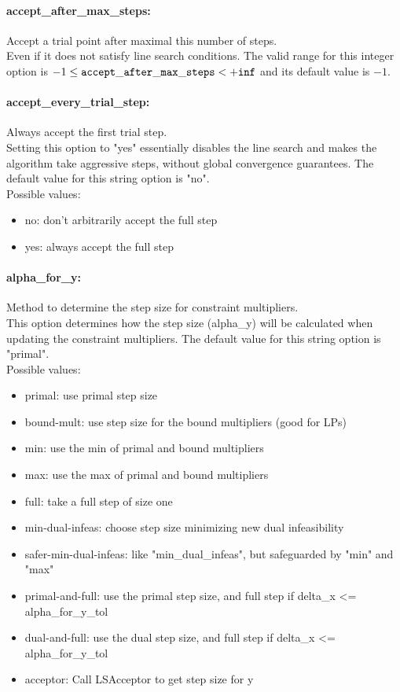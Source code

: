 \paragraph{accept\_after\_max\_steps:}\label{sec:accept_after_max_steps} Accept a trial point after maximal this number of steps. $\;$ \\
 Even if it does not satisfy line search
conditions. The valid range for this integer option is
$-1 \le {\tt accept\_after\_max\_steps } <  {\tt +inf}$
and its default value is $-1$.


\paragraph{accept\_every\_trial\_step:}\label{sec:accept_every_trial_step} Always accept the first trial step. $\;$ \\
 Setting this option to "yes" essentially disables
the line search and makes the algorithm take
aggressive steps, without global convergence
guarantees.
The default value for this string option is "no".
\\ 
Possible values:
\begin{itemize}
   \item no: don't arbitrarily accept the full step
   \item yes: always accept the full step
\end{itemize}

\paragraph{alpha\_for\_y:}\label{sec:alpha_for_y} Method to determine the step size for constraint multipliers. $\;$ \\
 This option determines how the step size
(alpha\_y) will be calculated when updating the
constraint multipliers.
The default value for this string option is "primal".
\\ 
Possible values:
\begin{itemize}
   \item primal: use primal step size
   \item bound-mult: use step size for the bound multipliers (good
for LPs)
   \item min: use the min of primal and bound multipliers
   \item max: use the max of primal and bound multipliers
   \item full: take a full step of size one
   \item min-dual-infeas: choose step size minimizing new dual
infeasibility
   \item safer-min-dual-infeas: like "min\_dual\_infeas", but safeguarded by
"min" and "max"
   \item primal-and-full: use the primal step size, and full step if
delta\_x <= alpha\_for\_y\_tol
   \item dual-and-full: use the dual step size, and full step if
delta\_x <= alpha\_for\_y\_tol
   \item acceptor: Call LSAcceptor to get step size for y
\end{itemize}


